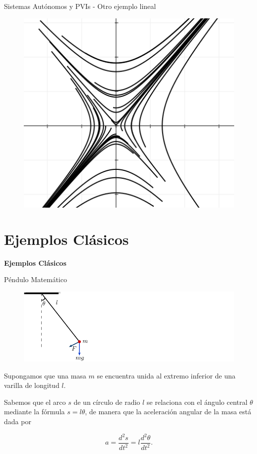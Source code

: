 \documentclass{beamer}
\newcommand{\stframe}[1]{\begin{frame} \begin{center}\Large{\textbf{{#1}}}\end{center}\end{frame}}
\begin{document}
\begin{frame}{Sistemas Autónomos y PVIs - Otro ejemplo lineal}
\begin{figure}[!ht] \centering
	\includegraphics[scale=0.5]{../figures/linearsystem-hyperbolas.png}
\end{figure}
\end{frame}


\section{Ejemplos Clásicos}
\stframe{Ejemplos Clásicos}

\begin{frame}{Péndulo Matemático}
\begin{figure} \centering
	\includegraphics[scale=0.8]{../figures/pendulum.pdf}
\end{figure}

Supongamos que una masa $m$ se encuentra unida al extremo inferior de una varilla de longitud $l$.

Sabemos que el arco $s$ de un círculo de radio $l$ se relaciona con el ángulo central $\theta$ mediante la fórmula $s = l\theta$, de manera que la aceleración angular de la masa está dada por

$$ a = \dfrac{d^2s}{dt^2} = l \dfrac{d^2\theta}{dt^2}.$$
\end{frame}
\end{document}
